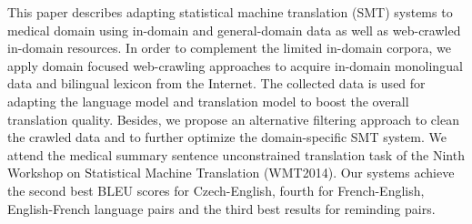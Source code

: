 This paper describes adapting statistical machine translation (SMT) systems to medical domain using in-domain and general-domain data as well as web-crawled in-domain resources. In order to complement the limited in-domain corpora, we apply domain focused web-crawling approaches to acquire in-domain monolingual data and bilingual lexicon from the Internet. The collected data is used for adapting the language model and translation model to boost the overall translation quality. Besides, we propose an alternative filtering approach to clean the crawled data and to further optimize the domain-specific SMT system. We attend the medical summary sentence unconstrained translation task of the Ninth Workshop on Statistical Machine Translation (WMT2014). Our systems achieve the second best BLEU scores for Czech-English, fourth for French-English, English-French language pairs and the third best results for reminding pairs.
